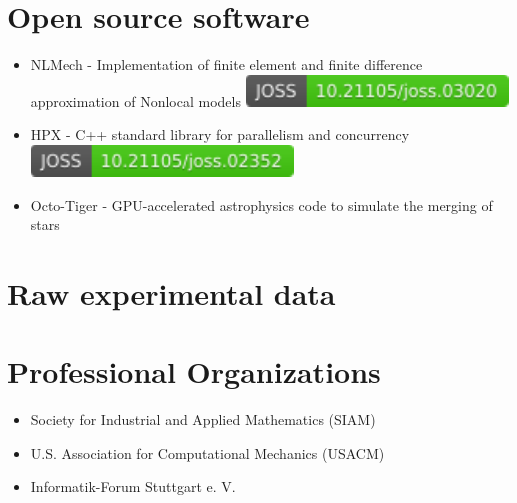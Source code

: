 \documentclass[11pt,a4paper,sans]{moderncv}
\begin{document}
\section{Open source software}
\cvitem{}{}
\begin{itemize}[leftmargin=4cm]
\item NLMech - Implementation of finite element and finite difference approximation of Nonlocal models \href{https://doi.org/10.21105/joss.03020}{\includegraphics[scale=0.5]{status-nlmech-small.pdf}}
\item HPX - C++ standard library for parallelism and concurrency \href{https://doi.org/10.21105/joss.02352}{\includegraphics[scale=0.5]{status-hpx.pdf}}
\item Octo-Tiger - GPU-accelerated astrophysics code to simulate the merging of stars
\end{itemize}


\section{Raw experimental data}
\section{Professional Organizations}
\cvitem{}{}
\begin{itemize}[leftmargin=4cm]
\item Society for Industrial and Applied Mathematics (SIAM)
\item U.S. Association for Computational Mechanics (USACM)
\item Informatik-Forum Stuttgart e. V.
\end{itemize}

\end{document}
